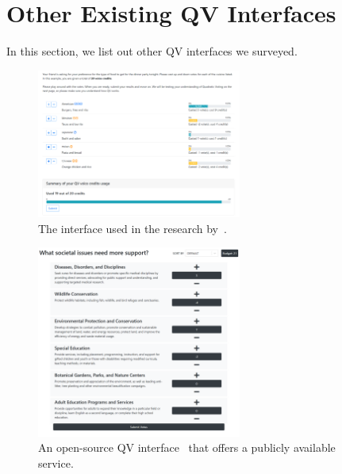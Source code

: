 \newpage
\section{Other Existing QV Interfaces}
In this section, we list out other QV interfaces we surveyed.


\begin{figure}[h!]
    \centering
    \includegraphics[width=0.6\textwidth]{content/image/curr_interface/cheng_qv.png}
    \caption{The interface used in the research by~\textcite{chengCanShowWhat2021}.}
    \label{fig:raymondQV}
\end{figure}

\begin{figure}[h!]
    \centering
    \includegraphics[width=0.6\textwidth]{content/image/curr_interface/geek.sg_interface.png}
    \caption{An open-source QV interface~\cite{yehjxraymondYehjxraymondQvapp2024} that offers a publicly available service.}
    \label{fig:raymondQV}
\end{figure}

